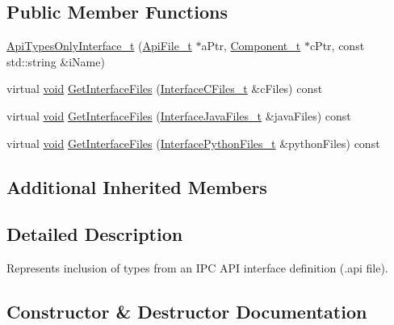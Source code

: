 \subsection*{Public Member Functions}
\begin{DoxyCompactItemize}
\item 
\hyperlink{structmodel_1_1_api_types_only_interface__t_aa14244dbd289c10f1686db50621af1fd}{Api\+Types\+Only\+Interface\+\_\+t} (\hyperlink{structmodel_1_1_api_file__t}{Api\+File\+\_\+t} $\ast$a\+Ptr, \hyperlink{structmodel_1_1_component__t}{Component\+\_\+t} $\ast$c\+Ptr, const std\+::string \&i\+Name)
\item 
virtual \hyperlink{_t_e_m_p_l_a_t_e__cdef_8h_ac9c84fa68bbad002983e35ce3663c686}{void} \hyperlink{structmodel_1_1_api_types_only_interface__t_a60ae86420b869a466b4113e3f184819e}{Get\+Interface\+Files} (\hyperlink{structmodel_1_1_interface_c_files__t}{Interface\+C\+Files\+\_\+t} \&c\+Files) const 
\item 
virtual \hyperlink{_t_e_m_p_l_a_t_e__cdef_8h_ac9c84fa68bbad002983e35ce3663c686}{void} \hyperlink{structmodel_1_1_api_types_only_interface__t_af9cd628dabf55e5ca96888637a58ee58}{Get\+Interface\+Files} (\hyperlink{structmodel_1_1_interface_java_files__t}{Interface\+Java\+Files\+\_\+t} \&java\+Files) const 
\item 
virtual \hyperlink{_t_e_m_p_l_a_t_e__cdef_8h_ac9c84fa68bbad002983e35ce3663c686}{void} \hyperlink{structmodel_1_1_api_types_only_interface__t_a527e72f5caa0ad95bf296efe75a66383}{Get\+Interface\+Files} (\hyperlink{structmodel_1_1_interface_python_files__t}{Interface\+Python\+Files\+\_\+t} \&python\+Files) const 
\end{DoxyCompactItemize}
\subsection*{Additional Inherited Members}


\subsection{Detailed Description}
Represents inclusion of types from an I\+PC A\+PI interface definition (.api file). 

\subsection{Constructor \& Destructor Documentation}
